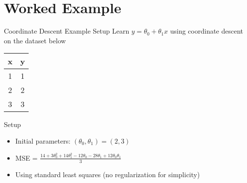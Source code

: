 \documentclass{beamer}
\begin{document}
\section{Worked Example}

\begin{frame}{Coordinate Descent Example Setup}
Learn $y = \theta_0 + \theta_1 x$ using coordinate descent on the dataset below

\begin{table}[]
\centering
\label{tab:my-table}
\begin{tabular}{|c|c|}
\hline
\textbf{x} & \textbf{y} \\ \hline
1 & 1 \\ \hline
2 & 2 \\ \hline
3 & 3 \\ \hline
\end{tabular}
\end{table}

\begin{codebox}{Setup}
\begin{itemize}
\item Initial parameters: $(\theta_0, \theta_1) = (2,3)$
\item MSE = $\frac{14 + 3\theta_0^2 + 14\theta_1^2 -12\theta_0 - 28\theta_1 + 12\theta_0\theta_1}{3}$
\item Using standard least squares (no regularization for simplicity)
\end{itemize}
\end{codebox}
\end{frame}
\end{document}
